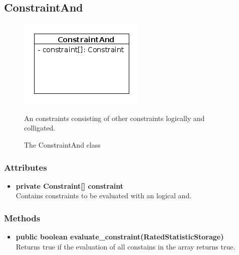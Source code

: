 \newpage
\subsection{ConstraintAnd}
\begin{figure}[htbp]
	\begin{minipage}[t]{8cm}
		\vspace{0pt}
		\centering
		\includegraphics[scale=0.6]{./diagram_pictures/reactor/ConstraintAnd.png}
		\caption{The ConstraintAnd class}
	\end{minipage}
	\hfill
	\begin{minipage}[t]{8cm}
		\vspace{10pt}
			An constraints consisting of other constraints logically and colligated.
	\end{minipage}
\end{figure}  

\subsubsection{Attributes}
\begin{itemize}
	\item \textbf{ private Constraint[] constraint }\\
	Contains constraints to be evaluated with an logical and.
\end{itemize}
\subsubsection{Methods}
\begin{itemize}
	\item \textbf{ public boolean evaluate\_constraint(RatedStatisticStorage) }\\
	Returns true if the evaluation of all constains in the array returns true.
\end{itemize}


\newpage
